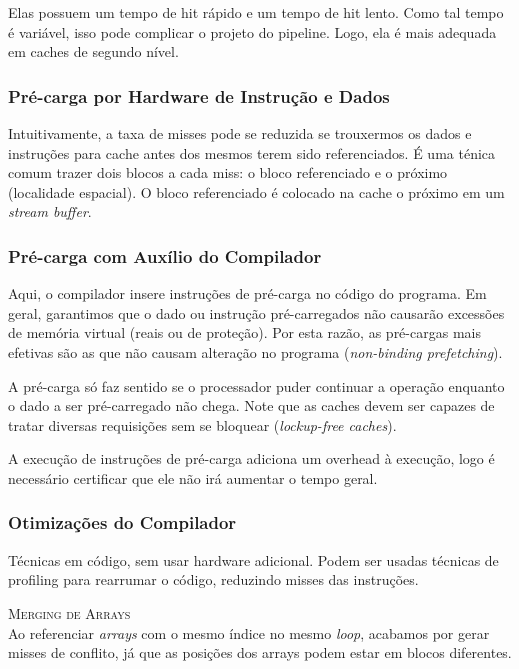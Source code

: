 Elas possuem um tempo de hit rápido e um tempo de hit lento. Como tal tempo é variável, isso pode complicar o projeto do pipeline. Logo, ela é mais adequada em caches de segundo nível.



\subsubsection{Pré-carga por Hardware de Instrução e Dados}
Intuitivamente, a taxa de misses pode se reduzida se trouxermos os dados e instruções para cache antes dos mesmos terem sido referenciados. É uma ténica comum trazer dois blocos a cada miss: o bloco referenciado e o próximo (localidade espacial). O bloco referenciado é colocado na cache o próximo em um \textit{stream buffer}.



\subsubsection{Pré-carga com Auxílio do Compilador}
Aqui, o compilador insere instruções de pré-carga no código do programa. Em geral, garantimos que o dado ou instrução pré-carregados não causarão excessões de memória virtual (reais ou de proteção). Por esta razão, as pré-cargas mais efetivas são as que não causam alteração no programa (\textit{non-binding prefetching}).

A pré-carga só faz sentido se o processador puder continuar a operação enquanto o dado a ser pré-carregado não chega. Note que as caches devem ser capazes de tratar diversas requisições sem se bloquear (\textit{lockup-free caches}).

A execução de instruções de pré-carga adiciona um overhead à execução, logo é necessário certificar que ele não irá aumentar o tempo geral.



\subsubsection{Otimizações do Compilador}
Técnicas em código, sem usar hardware adicional. Podem ser usadas técnicas de profiling para rearrumar o código, reduzindo misses das instruções.

\textsc{Merging de Arrays}\\
Ao referenciar \textit{arrays} com o mesmo índice no mesmo \textit{loop}, acabamos por gerar misses de conflito, já que as posições dos arrays podem estar em blocos diferentes.

